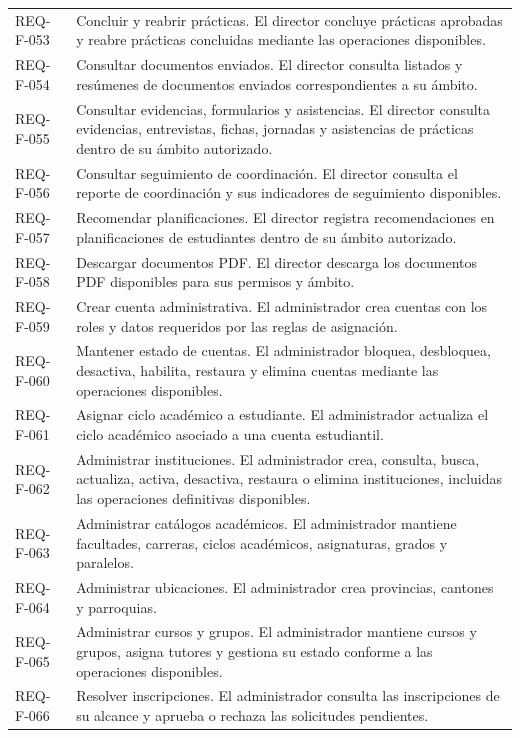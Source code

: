\documentclass[11pt,a4paper]{article}
\begin{document}
{\begin{longtable}{@{}P{2.5cm}P{12.6cm}@{}}
REQ-F-053 & Concluir y reabrir prácticas. El director concluye prácticas aprobadas y reabre prácticas concluidas mediante las operaciones disponibles.\\
REQ-F-054 & Consultar documentos enviados. El director consulta listados y resúmenes de documentos enviados correspondientes a su ámbito.\\
REQ-F-055 & Consultar evidencias, formularios y asistencias. El director consulta evidencias, entrevistas, fichas, jornadas y asistencias de prácticas dentro de su ámbito autorizado.\\
REQ-F-056 & Consultar seguimiento de coordinación. El director consulta el reporte de coordinación y sus indicadores de seguimiento disponibles.\\
REQ-F-057 & Recomendar planificaciones. El director registra recomendaciones en planificaciones de estudiantes dentro de su ámbito autorizado.\\
REQ-F-058 & Descargar documentos PDF. El director descarga los documentos PDF disponibles para sus permisos y ámbito.\\
REQ-F-059 & Crear cuenta administrativa. El administrador crea cuentas con los roles y datos requeridos por las reglas de asignación.\\
REQ-F-060 & Mantener estado de cuentas. El administrador bloquea, desbloquea, desactiva, habilita, restaura y elimina cuentas mediante las operaciones disponibles.\\
REQ-F-061 & Asignar ciclo académico a estudiante. El administrador actualiza el ciclo académico asociado a una cuenta estudiantil.\\
REQ-F-062 & Administrar instituciones. El administrador crea, consulta, busca, actualiza, activa, desactiva, restaura o elimina instituciones, incluidas las operaciones definitivas disponibles.\\
REQ-F-063 & Administrar catálogos académicos. El administrador mantiene facultades, carreras, ciclos académicos, asignaturas, grados y paralelos.\\
REQ-F-064 & Administrar ubicaciones. El administrador crea provincias, cantones y parroquias.\\
REQ-F-065 & Administrar cursos y grupos. El administrador mantiene cursos y grupos, asigna tutores y gestiona su estado conforme a las operaciones disponibles.\\
REQ-F-066 & Resolver inscripciones. El administrador consulta las inscripciones de su alcance y aprueba o rechaza las solicitudes pendientes.\\

\end{longtable}}
\end{document}
